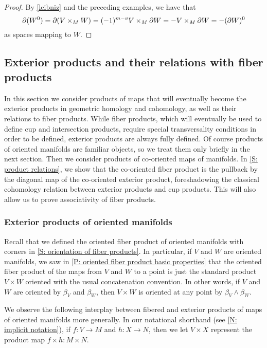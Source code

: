 \begin{proof}
	By \cref{leibniz} and the preceding examples, we have that
	$$\partial (W^0) = \partial (V \times_M W) = (-1)^{m-v} V \times_M \partial W = -V \times_M \partial W = -(\partial W)^0$$
	as spaces mapping to $W$.
\end{proof}

\subsection{Exterior products and their relations with fiber products}\label{S: exterior products}
In this section we consider products of maps that will eventually become the exterior products in geometric homology and cohomology, as well as their relations to fiber products.
While fiber products, which will eventually be used to define cup and intersection products, require special transversality conditions in order to be defined, exterior products are always fully defined.
Of course products of oriented manifolds are familiar objects, so we treat them only briefly in the next section.
Then we consider products of co-oriented maps of manifolds.
In \cref{S: product relations}, we show that the co-oriented fiber product is the pullback by the diagonal map of the co-oriented exterior product, foreshadowing the classical cohomology relation between exterior products and cup products.
This will also allow us to prove associativity of fiber products.

\subsubsection{Exterior products of oriented manifolds}

Recall that we defined the oriented fiber product of oriented manifolds with corners in \cref{S: orientation of fiber products}.
In particular, if $V$ and $W$ are oriented manifolds, we saw in \cref{P: oriented fiber product basic properties} that the oriented fiber product of the maps from $V$ and $W$ to a point is just the standard product $V \times W$ oriented with the usual concatenation convention.
In other words, if $V$ and $W$ are oriented by $\beta_V$ and $\beta_W$, then $V \times W$ is oriented at any point by $\beta_V \wedge \beta_W$.

We observe the following interplay between fibered and exterior products of maps of oriented manifolds more generally.
In our notational shorthand (see \cref{N: implicit notation}), if $f \colon V \to M$ and $h \colon X \to N$, then we let $V \times X$ represent the product map $f \times h \colon M \times N$.

